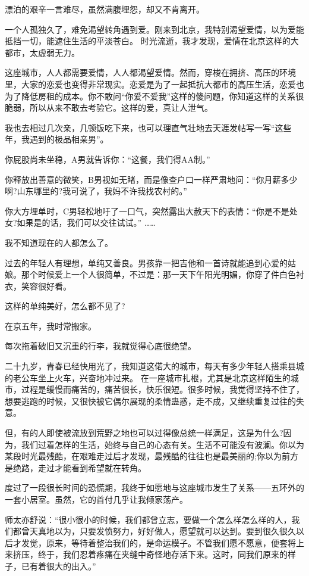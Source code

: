 \documentclass[UTF8,a4paper,8pt]{ctexart}
\begin{document}
 漂泊的艰辛一言难尽，虽然满腹埋怨，却又不肯离开。
 
 一个人孤独久了，难免渴望转角遇到爱。刚来到北京，我特别渴望爱情，以为爱能抵挡一切，能遮住生活的平淡苍白。
 时光流逝，我才发现，爱情在北京这样的大都市，太虚弱无力。
 
 这座城市，人人都需要爱情，人人都渴望爱情。然而，穿梭在拥挤、高压的环境里，大家的恋爱也变得非常现实。恋爱是为了一起抵抗大都市的高压生活，恋爱也为了降低房租的成本。你不敢问“你爱不爱我”这样的傻问题，你知道这样的关系很脆弱，所以从来不敢去考验它。这样的爱，真让人泄气。
 
 我也去相过几次亲，几顿饭吃下来，也可以理直气壮地去天涯发帖写一写“这些年，我遇到的极品相亲男”。
 
 你屁股尚未坐稳，A男就告诉你：“这餐，我们得AA制。”
 
 你释放出善意的微笑，B男视如无睹，而是像查户口一样严肃地问：“你月薪多少啊?山东哪里的?我可说了，我妈不许我找农村的。”
 
 你大方埋单时，C男轻松地吁了一口气，突然露出大赦天下的表情：“你是不是处女?如果是的话，我们可以交往试试。”
 ……
 
 我不知道现在的人都怎么了。
 
 过去的年轻人有理想，单纯又善良。男孩靠一把吉他和一首诗就能追到心爱的姑娘。那个时候爱上一个人很简单，不过是：那一天下午阳光明媚，你穿了件白色衬衣，笑容很好看。
 
 这样的单纯美好，怎么都不见了?
 
 在京五年，我时常搬家。
 
 每次拖着破旧又沉重的行李，我就觉得心底很绝望。
 
 二十九岁，青春已经快用光了，我知道这偌大的城市，每天有多少年轻人搭乘县城的老公车坐上火车，兴奋地冲过来。
 在一座城市扎根，尤其是北京这样陌生的城市，过程是缓慢而痛苦的，痛苦很长，快乐很短。很多时候，我觉得坚持不住了，想要逃跑的时候，又很快被它偶尔展现的柔情蛊惑，走不成，又继续重复过往的失意。
 
 但，有的人即使被流放到荒野之地也可以过得像总统一样满足，这是为什么?因为，我们过着怎样的生活，始终与自己的心态有关。生活不可能没有波澜。你以为某段时光最残酷，在艰难走过后才发现，最残酷的往往也是最美丽的;你以为前方是绝路，走过才能看到希望就在转角。
 
 度过了一段很长时间的恐慌期，我终于如愿地与这座城市发生了关系——五环外的一套小居室。虽然，它的首付几乎让我倾家荡产。
 
 师太亦舒说：“很小很小的时候，我们都曾立志，要做一个怎么样怎么样的人，我们都曾天真地以为，只要发愤努力，好好做人，愿望就可以达到。要到很久很久以后才发觉，原来，等待着整治我们的，是命运模子。不管我们愿不愿意，便套将上来挤压，终于，我们忍着疼痛在夹缝中奇怪地存活下来。这时，同我们原来的样子，已有着很大的出入。”
 
\end{document}

